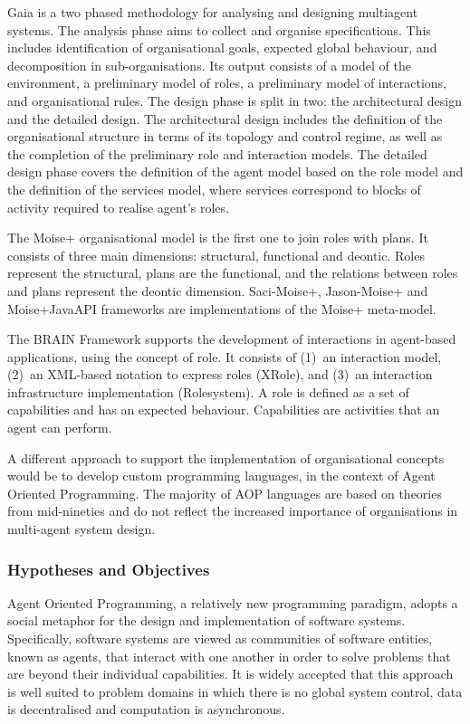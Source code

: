 \documentclass[a4paper,12pt,oneside]{book} %
\theoremstyle{remark}
\theoremstyle{plain}
\begin{document}
Gaia \cite{DBLP:journals/aamas/WooldridgeJK00} is a two phased methodology for
analysing and designing multiagent systems. The analysis phase aims to collect
and organise specifications. This includes identification of organisational
goals, expected global behaviour, and decomposition in sub-organisations. Its
output consists of a model of the environment, a preliminary model of roles, a
preliminary model of interactions, and organisational rules. The design phase
is split in two: the architectural design and the detailed design. The
architectural design includes the definition of the organisational structure in
terms of its topology and control regime, as well as the completion of the
preliminary role and interaction models. The detailed design phase covers the
definition of the agent model based on the role model and the definition of the
services model, where services correspond to blocks of activity required to
realise agent's roles.

The Moise+ \cite{DBLP:conf/sbia/HubnerSB02} organisational model is the first one to
join roles with plans. It consists of three main dimensions: structural,
functional and deontic. Roles represent the structural, plans are the
functional, and the relations between roles and plans represent the deontic
dimension. Saci-Moise+, Jason-Moise+ and Moise+JavaAPI frameworks are
implementations of the Moise+ meta-model.

The BRAIN Framework \cite{DBLP:conf/coopis/CabriLZ03} supports the development
of interactions in agent-based applications, using the concept of role. It
consists of (1)~an interaction model, (2)~an XML-based notation to express
roles (XRole), and (3)~an interaction infrastructure implementation
(Rolesystem). A role is defined as a set of capabilities and has an expected
behaviour. Capabilities are activities that an agent can perform.

A different approach to support the implementation of organisational
concepts would be to develop custom programming languages, in the context
of Agent Oriented Programming. The majority of AOP languages are based on
theories from mid-nineties and do not reflect the increased importance of
organisations in multi-agent system design.

\subsubsection{Hypotheses and Objectives}
Agent Oriented Programming, a relatively new programming paradigm, adopts a
social metaphor for the design and implementation of software systems.
Specifically, software systems are viewed as communities of software entities,
known as agents, that interact with one another in order to solve problems that
are beyond their individual capabilities. It is widely accepted that this
approach is well suited to problem domains in which there is no global system
control, data is decentralised and computation is asynchronous.
\end{document}
